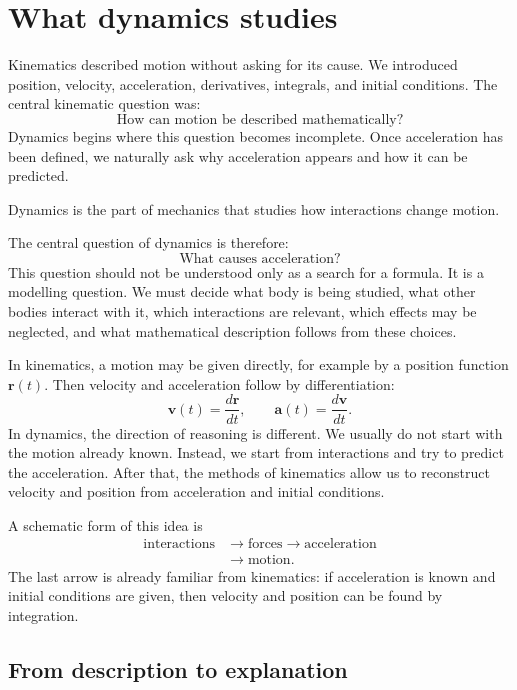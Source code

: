 \section{What dynamics studies}

Kinematics described motion without asking for its cause. We introduced position, velocity, acceleration, derivatives, integrals, and initial conditions. The central kinematic question was:
\[
\text{How can motion be described mathematically?}
\]
Dynamics begins where this question becomes incomplete. Once acceleration has been defined, we naturally ask why acceleration appears and how it can be predicted.

\begin{definitionbox}
Dynamics is the part of mechanics that studies how interactions change motion.
\end{definitionbox}

The central question of dynamics is therefore:
\[
\text{What causes acceleration?}
\]
This question should not be understood only as a search for a formula. It is a modelling question. We must decide what body is being studied, what other bodies interact with it, which interactions are relevant, which effects may be neglected, and what mathematical description follows from these choices.

In kinematics, a motion may be given directly, for example by a position function \(\mathbf{r}(t)\). Then velocity and acceleration follow by differentiation:
\[
\mathbf{v}(t)=\frac{d\mathbf{r}}{dt},
\qquad
\mathbf{a}(t)=\frac{d\mathbf{v}}{dt}.
\]
In dynamics, the direction of reasoning is different. We usually do not start with the motion already known. Instead, we start from interactions and try to predict the acceleration. After that, the methods of kinematics allow us to reconstruct velocity and position from acceleration and initial conditions.

A schematic form of this idea is
\[
\begin{aligned}
\text{interactions}
&\longrightarrow \text{forces}
\longrightarrow \text{acceleration} \\
&\longrightarrow \text{motion}.
\end{aligned}
\]
The last arrow is already familiar from kinematics: if acceleration is known and initial conditions are given, then velocity and position can be found by integration.

\subsection{From description to explanation}

